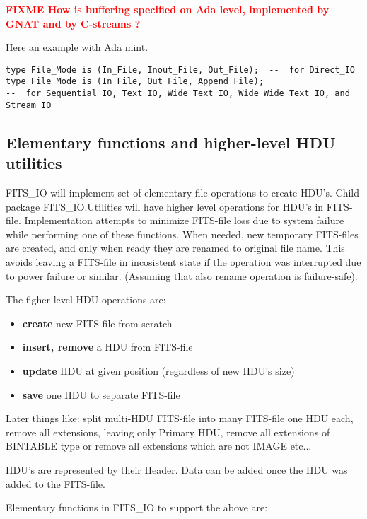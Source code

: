 \documentclass[a4paper,10pt]{article}
\newcommand{\fixme}[1]{\textbf{\textcolor{red}{FIXME #1}}}
\begin{document}
\fixme{How is buffering specified on Ada level, implemented by GNAT and by C-streams ?}

Here an example with Ada mint. 
\begin{verbatim}
type File_Mode is (In_File, Inout_File, Out_File);  --  for Direct_IO
type File_Mode is (In_File, Out_File, Append_File);
--  for Sequential_IO, Text_IO, Wide_Text_IO, Wide_Wide_Text_IO, and Stream_IO
\end{verbatim} 

\subsection{Elementary functions and higher-level HDU utilities}
\label{sec:elemntaryfuncs}

FITS\_IO will implement set of elementary file operations to 
create HDU's. Child package FITS\_IO.Utilities will have higher level
operations for HDU's in FITS-file. Implementation attempts to minimize
FITS-file loss due to system failure 
while performing one of these functions.
When needed, new temporary FITS-files are created, 
and only when ready they are renamed to original file name. 
This avoids leaving a FITS-file in incosistent state
if the operation was interrupted due to power failure or similar.
(Assuming that also rename operation is failure-safe).

The figher level HDU operations are:
\begin{itemize}
\item \textbf{create} new FITS file from scratch
\item \textbf{insert, remove} a HDU from FITS-file
\item \textbf{update} HDU at given position (regardless of new HDU's size)
\item \textbf{save} one HDU to separate FITS-file
\end{itemize}

Later things like: split multi-HDU FITS-file into many FITS-file one HDU each,
remove all extensions, leaving only Primary HDU,
remove all extensions of BINTABLE type or 
remove all extensions which are not IMAGE etc...

HDU's are represented by their Header. 
Data can be added once the HDU
was added to the FITS-file.

Elementary functions in FITS\_IO to support the above are:
\end{document}
